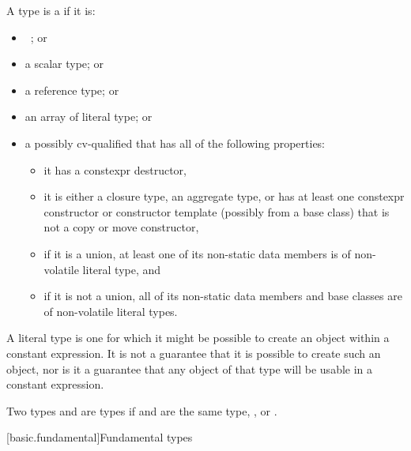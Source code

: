\pnum
A type is a  if it is:
\begin{itemize}
\item \cv{}~; or
\item a scalar type; or
\item a reference type; or
\item an array of literal type; or
\item a possibly cv-qualified  that
has all of the following properties:
\begin{itemize}
\item it has a constexpr destructor,
\item it is either a closure type,
an aggregate type, or
has at least one constexpr constructor or constructor template
(possibly  from a base class)
that is not a copy or move constructor,
\item if it is a union, at least one of its non-static data members is
of non-volatile literal type, and
\item if it is not a union, all of its non-static data members and base classes are
of non-volatile literal types.
\end{itemize}
\end{itemize}
\begin{note}
A literal type is one for which
it might be possible to create an object
within a constant expression.
It is not a guarantee that it is possible to create such an object,
nor is it a guarantee that any object of that type
will be usable in a constant expression.
\end{note}

\pnum
{}%
Two types   and   are
 types
if  and  are the same type,
, or
.

[basic.fundamental]{Fundamental types}

